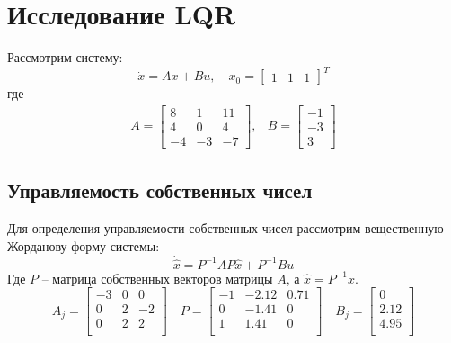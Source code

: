\section{Исследование LQR}
Рассмотрим систему: 
\begin{equation}
    \dot{x} = Ax + Bu, \quad x_0 = \begin{bmatrix}1 & 1 & 1\end{bmatrix}^T
\end{equation}
где 
\begin{equation}
    \begin{array}{cc}
        A = \begin{bmatrix}
            8 & 1 & 11 \\ 
            4 & 0 & 4 \\
            -4 & -3 & -7
        \end{bmatrix}, &
        B = \begin{bmatrix}
            -1 \\ -3 \\ 3
        \end{bmatrix}
    \end{array}
\end{equation}
\subsection{Управляемость собственных чисел}

Для определения управляемости собственных чисел рассмотрим вещественную Жорданову форму системы: 
\begin{equation}
    \dot{\hat{x}} = P^{-1}AP\hat{x} + P^{-1}Bu
\end{equation}
Где $P$ -- матрица собственных векторов матрицы $A$, а $\hat{x} = P^{-1}x$.
\begin{equation}
    A_j = \begin{bmatrix}
        -3  & 0  & 0 \\ 
        0  & 2  & -2 \\ 
        0  & 2  & 2 \\ 
    \end{bmatrix}\quad
    P = \begin{bmatrix}
        -1  & -2.12  & 0.71 \\ 
        0  & -1.41  & 0 \\ 
        1  & 1.41  & 0 \\ 
    \end{bmatrix}\quad 
    B_j = \begin{bmatrix}
        0 \\ 
        2.12 \\ 
        4.95 \\ 
    \end{bmatrix}
\end{equation}


